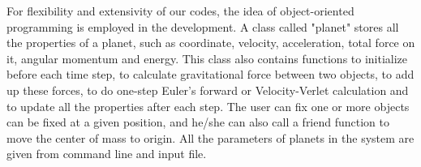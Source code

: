 For flexibility and extensivity of our codes, the idea of object-oriented programming is employed in the development. 
A class called "planet" stores all the properties of a planet, such as coordinate, velocity, acceleration, total force on it, 
angular momentum and energy. 
This class also contains functions to initialize before each time step, to calculate gravitational force between two objects, 
to add up these forces, to do one-step Euler's forward or Velocity-Verlet calculation and to update all the properties after each step. 
The user can fix one or more objects can be fixed at a given position, 
and he/she can also call a friend function to move the center of mass to origin. 
All the parameters of planets in the system are given from command line and input file. 